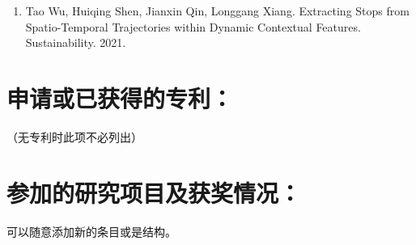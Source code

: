 {
\setlist[enumerate]{}%
\begin{enumerate}[nosep]
    \item Tao Wu, Huiqing Shen, Jianxin Qin, Longgang Xiang. Extracting Stops from Spatio-Temporal Trajectories within Dynamic Contextual Features. Sustainability. 2021.
\end{enumerate}
}

\section*{申请或已获得的专利：}

（无专利时此项不必列出）

\section*{参加的研究项目及获奖情况：}

可以随意添加新的条目或是结构。

\cleardoublepage[plain]%

